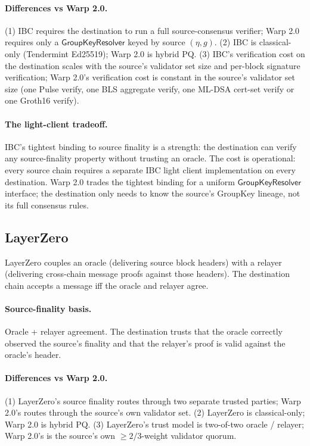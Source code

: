 \paragraph{Differences vs Warp 2.0.} (1) IBC requires the destination to run a full source-consensus verifier; Warp 2.0 requires only a $\mathsf{GroupKeyResolver}$ keyed by source $(\eta, g)$. (2) IBC is classical-only (Tendermint Ed25519); Warp 2.0 is hybrid PQ. (3) IBC's verification cost on the destination scales with the source's validator set size and per-block signature verification; Warp 2.0's verification cost is constant in the source's validator set size (one Pulse verify, one BLS aggregate verify, one ML-DSA cert-set verify or one Groth16 verify).

\paragraph{The light-client tradeoff.} IBC's tightest binding to source finality is a strength: the destination can verify any source-finality property without trusting an oracle. The cost is operational: every source chain requires a separate IBC light client implementation on every destination. Warp 2.0 trades the tightest binding for a uniform $\mathsf{GroupKeyResolver}$ interface; the destination only needs to know the source's GroupKey lineage, not its full consensus rules.

\subsection{LayerZero}

LayerZero \cite{layerzero} couples an oracle (delivering source block headers) with a relayer (delivering cross-chain message proofs against those headers). The destination chain accepts a message iff the oracle and relayer agree.

\paragraph{Source-finality basis.} Oracle + relayer agreement. The destination trusts that the oracle correctly observed the source's finality and that the relayer's proof is valid against the oracle's header.

\paragraph{Differences vs Warp 2.0.} (1) LayerZero's source finality routes through two separate trusted parties; Warp 2.0's routes through the source's own validator set. (2) LayerZero is classical-only; Warp 2.0 is hybrid PQ. (3) LayerZero's trust model is two-of-two oracle / relayer; Warp 2.0's is the source's own $\geq 2/3$-weight validator quorum.

